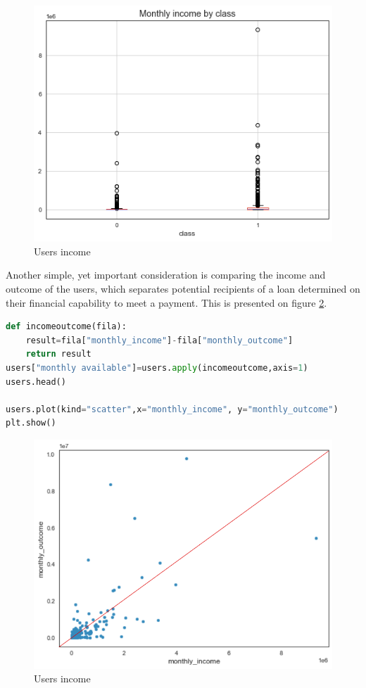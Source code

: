 \documentclass[a4paper,12pt]{article}
\begin{document}
\begin{figure}[h!]
    \centering
    \includegraphics[scale=0.8]{Images/users_class_boxplot.png}
    \caption{Users income}
    \label{fig:usersboxplot}
\end{figure}\newpage

Another simple, yet important consideration is comparing the income and outcome of the users, which separates potential recipients of a loan determined on their financial capability to meet a payment. This is presented on figure \ref{fig:usersscatter}.\vspace{3mm}

\begin{lstlisting}[language=python,caption = {Income/Outcome}]
def incomeoutcome(fila):
    result=fila["monthly_income"]-fila["monthly_outcome"]
    return result
users["monthly available"]=users.apply(incomeoutcome,axis=1)
users.head()

users.plot(kind="scatter",x="monthly_income", y="monthly_outcome")
plt.show()
\end{lstlisting}

\begin{figure}[h!]
    \centering
    \includegraphics[scale=0.75]{Images/users_class_scatter.png}
    \caption{Users income}
    \label{fig:usersscatter}
\end{figure}\newpage
\end{document}
